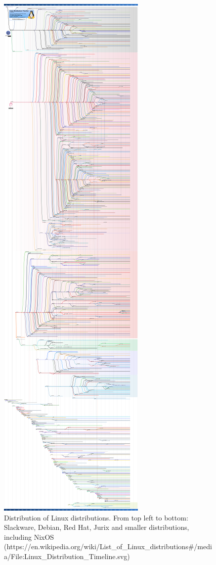 \begin{figure}
    \centering
    \includegraphics[scale=0.4]{latex/kuvat/timeline.png}
    \caption{Distribution of Linux distributions. From top left to bottom: Slackware, Debian, Red Hat, Jurix and smaller distributions, including NixOS (https://en.wikipedia.org/wiki/List\_of\_Linux\_distributions#/media/File:Linux\_Distribution\_Timeline.svg)}
    \label{timeline}
\end{figure}

